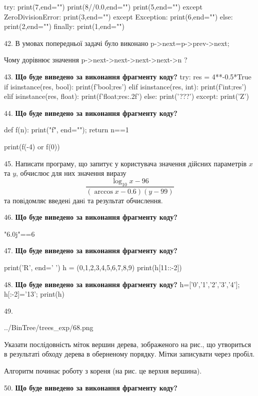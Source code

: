 \documentclass[11pt]{article}
\begin{document}
try:
    print(7,end="")
    print(8//0.0,end="")
    print(5,end="")
except ZeroDivisionError: print(3,end="")
except Exception: print(6,end="")
else: print(2,end="")
finally: print(1,end="")
\par\vspace{5mm}
42. 
В умовах попередньої задачі було виконано p->next=p->prev->next;

Чому дорівнює значення p->next->next->next->next->n ?\par\vspace{5mm}
43. \textbf{Що буде виведено за виконання фрагменту коду?}
try:
    res = 4**-0.5*True
    if isinstance(res, bool):
        print(f'bool;{res}')
    elif isinstance(res, int):
        print(f'int;{res}')
    elif isinstance(res, float):
        print(f'float;{res:.2f}')
    else:
        print('???')
except:
    print('Z')
\par\vspace{5mm}
44. \textbf{Що буде виведено за виконання фрагменту коду?}

def f(n):
    print("f", end="");
    return n==1

print(f(-4) or f(0))
\par\vspace{5mm}
45. 
Написати програму, що запитує у користувача значення дійсних параметрів $x$ та $y$, обчислює для них значення виразу 
$$\frac{\log_{10} x - 96}{(\arccos x - 0.6) (y - 99)}$$ 
та повiдомляє введенi данi та результат обчислення.

\par\vspace{5mm}
46. \textbf{Що буде виведено за виконання фрагменту коду?}

"6.0j"==6
\par\vspace{5mm}
47. \textbf{Що буде виведено за виконання фрагменту коду?}

print('R', end=' ')
h = (0,1,2,3,4,5,6,7,8,9)
print(h[11::-2])

\par\vspace{5mm}
48. \textbf{Що буде виведено за виконання фрагменту коду?}
h=['0','1','2','3','4']; h[:-2]='13'; print(h)\par\vspace{5mm}
49. 

\begin{center}
	{../BinTree/trees_exp/68.png}
\end{center}
Указати послідовність міток вершин дерева, зображеного на рис., що утвориться в результаті обходу дерева в оберненому порядку. Мітки записувати через пробіл.\par Алгоритм починає роботу з кореня (на рис. це верхня вершина).
\par\vspace{5mm}
50. \textbf{Що буде виведено за виконання фрагменту коду?}
\end{document}
